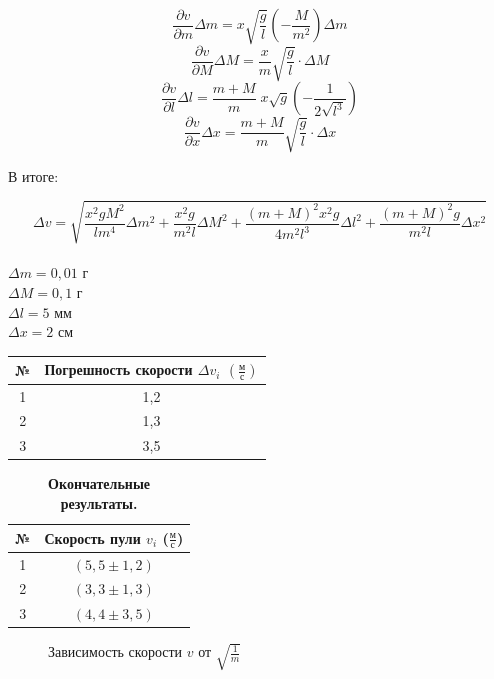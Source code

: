 \documentclass{article}
\begin{document}
	 $$\frac{\partial v}{\partial m}\Delta m =x\sqrt{\frac{g}{l}}\left(-\frac{M}{m^2}\right) \Delta m$$
	 $$ \frac{\partial v}{\partial M}\Delta M = \frac{x}{m}\sqrt{\frac{g}{l}}\cdot\Delta M$$
	 $$ \frac{\partial v}{\partial l}\Delta l = \frac{m+M}{m}\;x\sqrt{g}\left( -\frac{1}{2\sqrt{l^3}}\right) $$
	 $$ \frac{\partial v}{\partial x}\Delta x = \frac{m+M}{m}\sqrt{\frac{g}{l}}\cdot\Delta x$$

В итоге:

$$ \Delta v = \sqrt{\frac{x^2 g M^2}{l m^4}\Delta m^2 +  \frac{x^2 g}{m^2 l}\Delta M^2 + \frac{(m+M)^2 x^2 g}{4m^2 l^3}\Delta l^2 + \frac{(m+M)^2 g}{m^2 l}\Delta x^2}$$\\
$\Delta m = 0,01$ г\\
$ \Delta M = 0,1$ г\\
$ \Delta l =  5$ мм\\
$ \Delta x = 2 $ см
\begin{table}[htb]
	\centering
	\begin{tabular}{|c|c|}
		\hline
		№ & Погрешность скорости $\Delta v_i$ $\left( \frac{\mbox{м}}{\mbox{с}}\right) $\\
		\hline
		1 & 1,2 \\
		\hline
		2 & 1,3\\
		\hline
		3 &  3,5\\
		\hline
	\end{tabular}
\end{table}


\begin{table}[htb]
	\caption{\bf Окончательные результаты.}
	\centering
	\begin{tabular}{|c|c|}
		\hline
		№ & Скорость пули $v_i$ ($\frac{\mbox{м}}{\mbox{с}}$) \\
		\hline
		1 &  $\left( 5,5\pm1,2\right) $ \\
		\hline
		2 &  $\left( 3,3\pm1,3\right) $ \\
		\hline
		3 & $\left( 4,4\pm3,5\right) $ \\
		\hline
	\end{tabular}
\end{table}

\begin{figure}[!htb]
	\centering
	\caption{Зависимость скорости $v$ от $\sqrt{\frac{1}{m}}$}
\end{figure}
\end{document}
